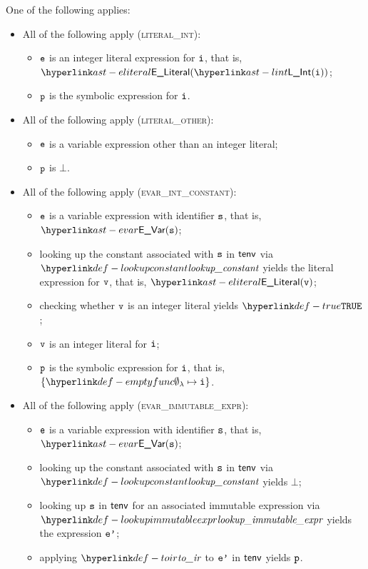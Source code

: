 One of the following applies:
\begin{itemize}
  \item All of the following apply (\textsc{literal\_int}):
  \begin{itemize}
    \item $\texttt{e}$ is an integer literal expression for $\texttt{i}$, that is, $\ELiteral(\lint(\vi))$;
    \item $\texttt{p}$ is the symbolic expression for $\texttt{i}$.
  \end{itemize}

  \item All of the following apply (\textsc{literal\_other}):
  \begin{itemize}
    \item $\texttt{e}$ is a variable expression other than an integer literal;
    \item $\texttt{p}$ is $\bot$.
  \end{itemize}

  \item All of the following apply (\textsc{evar\_int\_constant}):
  \begin{itemize}
    \item $\texttt{e}$ is a variable expression with identifier $\texttt{s}$, that is, $\EVar(\vs)$;
    \item looking up the constant associated with $\texttt{s}$ in $\textsf{tenv}$ via $\lookupconstant$ yields the literal expression for $\texttt{v}$, that is, $\ELiteral(\vv)$;
    \item checking whether $\texttt{v}$ is an integer literal yields $\True$\ProseOrTypeError;
    \item $\texttt{v}$ is an integer literal for $\texttt{i}$;
    \item $\texttt{p}$ is the symbolic expression for $\texttt{i}$, that is, $\{ \emptyfunc\mapsto \vi \}$.
  \end{itemize}

  \item All of the following apply (\textsc{evar\_immutable\_expr}):
  \begin{itemize}
    \item $\texttt{e}$ is a variable expression with identifier $\texttt{s}$, that is, $\EVar(\vs)$;
    \item looking up the constant associated with $\texttt{s}$ in $\textsf{tenv}$ via $\lookupconstant$ yields $\bot$;
    \item looking up $\texttt{s}$ in $\textsf{tenv}$ for an associated immutable expression via $\lookupimmutableexpr$ yields the expression $\texttt{e'}$;
    \item applying $\toir$ to $\texttt{e'}$ in $\textsf{tenv}$ yields $\texttt{p}$.
  \end{itemize}


\end{itemize}
